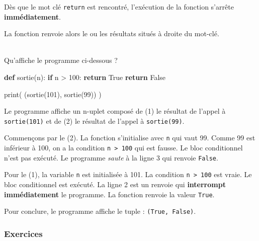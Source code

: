 \documentclass[a4paper,17pt]{extarticle}
\newenvironment{eleve}%
{\begin{activite}\color{noiramu}\\[-0.5cm]}
{\end{activite}}
\newenvironment{Shaded}{}{}
\newcommand{\KeywordTok}[1]{\textcolor[rgb]{0.00,0.44,0.13}{\textbf{{#1}}}}
\newcommand{\DecValTok}[1]{\textcolor[rgb]{0.25,0.63,0.44}{{#1}}}
\newcommand{\NormalTok}[1]{{#1}}
\newcommand{\VariableTok}[1]{\textcolor[rgb]{0.10,0.09,0.49}{{#1}}}
\newcommand{\ControlFlowTok}[1]{\textcolor[rgb]{0.00,0.44,0.13}{\textbf{{#1}}}}
\newcommand{\OperatorTok}[1]{\textcolor[rgb]{0.40,0.40,0.40}{{#1}}}
\newcommand{\BuiltInTok}[1]{{#1}}
\begin{document}
    Dès que le mot clé \texttt{return} est rencontré, l'exécution de la
fonction s'arrête \textbf{immédiatement}.

La fonction renvoie alors le ou les résultats situés à droite du
mot-clé.
\begin{eleve}
    Qu'affiche le programme ci-dessous ?

\begin{Shaded}
\begin{Highlighting}[]
\KeywordTok{def}\NormalTok{ sortie(n):}
    \ControlFlowTok{if}\NormalTok{ n }\OperatorTok{\textgreater{}} \DecValTok{100}\NormalTok{:}
        \ControlFlowTok{return} \VariableTok{True}
    \ControlFlowTok{return} \VariableTok{False}

\BuiltInTok{print}\NormalTok{( (sortie(}\DecValTok{101}\NormalTok{), sortie(}\DecValTok{99}\NormalTok{)) )}
\end{Highlighting}
\end{Shaded}
        
        \end{eleve}\begin{reponse}
    Le programme affiche un n-uplet composé de (1) le résultat de l'appel à
\texttt{sortie(101)} et de (2) le résultat de l'appel à
\texttt{sortie(99)}.

Commençons par le (2). La fonction s'initialise avec \texttt{n} qui vaut
99. Comme 99 est inférieur à 100, on a la condition
\texttt{n\ \textgreater{}\ 100} qui est fausse. Le bloc conditionnel
n'est pas exécuté. Le programme \emph{saute} à la ligne 3 qui renvoie
\texttt{False}.

Pour le (1), la variable \texttt{n} est initialisée à 101. La condition
\texttt{n\ \textgreater{}\ 100} est vraie. Le bloc conditionnel est
exécuté. La ligne 2 est un renvoie qui \textbf{interrompt immédiatement}
le programme. La fonction renvoie la valeur \texttt{True}.

Pour conclure, le programme affiche le tuple : \texttt{(True,\ False)}.

        \end{reponse}
    \hypertarget{exercices}{%
\subsubsection{Exercices}\label{exercices}}
\end{document}
